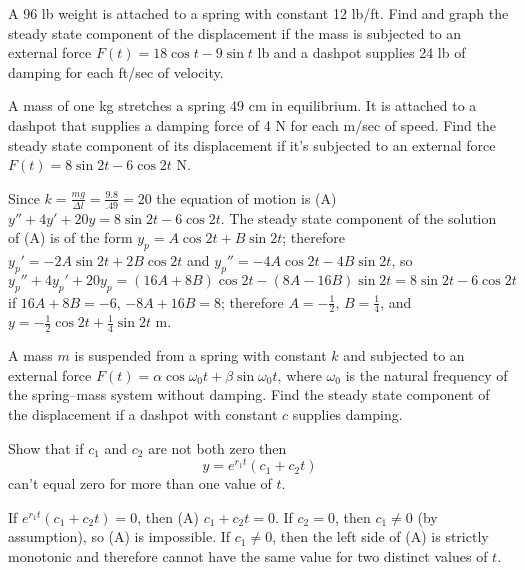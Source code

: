 \documentclass{ximera}
\begin{document}
\begin{problem}\label{exer:6.2.19}  
A 96 lb weight is attached to a spring with constant 12 lb/ft. Find
and graph the steady state component of the displacement if the mass is
subjected to an external force $F(t)=18\cos t-9\sin t$ lb and a
dashpot supplies 24 lb of damping for each ft/sec of velocity.
\end{problem}

\begin{problem}\label{exer:6.2.20}
A mass of one kg stretches a spring 49 cm in equilibrium. It is
attached to a dashpot that supplies a damping force of 4 N for each
m/sec of speed. Find the steady state component of its displacement if
it's subjected to an external force $F(t)=8\sin2t-6\cos2t$ N.

\begin{solution}
Since $k=\frac{mg}{\Delta l}=\frac{9.8}{.49}=20$ the
equation of motion is
(A) $y''+4y'+20y=8\sin2t-6\cos2t$.
The steady state component of the solution of (A)
is of the form
$y_p=A\cos2t+B\sin2t$; therefore $y_p'=-2A\sin2t+2B\cos2t$
and $y_p''=-4A\cos2t-4B\sin2t$, so
$y_p''+4y_p'+20y_p=(16A+8B)\cos2t-(8A-16B)\sin2t=8\sin2t-6\cos2t$
if $16A+8B=-6$, $-8A+16B=8$; therefore $A=-\frac{1}{2}$,
$B=\frac{1}{4}$, and
$y=-\frac{1}{2}\cos2t+\frac{1}{4}\sin2t$ m.
\end{solution}
\end{problem}

\begin{problem}\label{exer:6.2.21}
A mass $m$ is suspended from a spring with constant $k$ and subjected to an
external force $F(t)=\alpha\cos\omega_0t+\beta\sin\omega_0t$, where
$\omega_0$ is the natural frequency of the spring--mass system without
damping. Find the steady state component of the displacement if a dashpot
with constant $c$ supplies damping.
\end{problem}

\begin{problem}\label{exer:6.2.22}
Show that if $c_1$ and $c_2$ are not both zero then
$$
y=e^{r_1t}(c_1+c_2t)
$$
can't equal zero for more than one value of
$t$.

\begin{solution}
    If $e^{r_1t}(c_1+c_2t)=0$, then (A) $c_1+c_2t=0$. If $c_2=0$, then
$c_1\ne0$ (by assumption), so (A) is impossible. If $c_1\ne0$, then the
left side of (A) is strictly monotonic and therefore cannot have the
same value for two distinct values of $t$.
\end{solution}
\end{problem}
\end{document}
